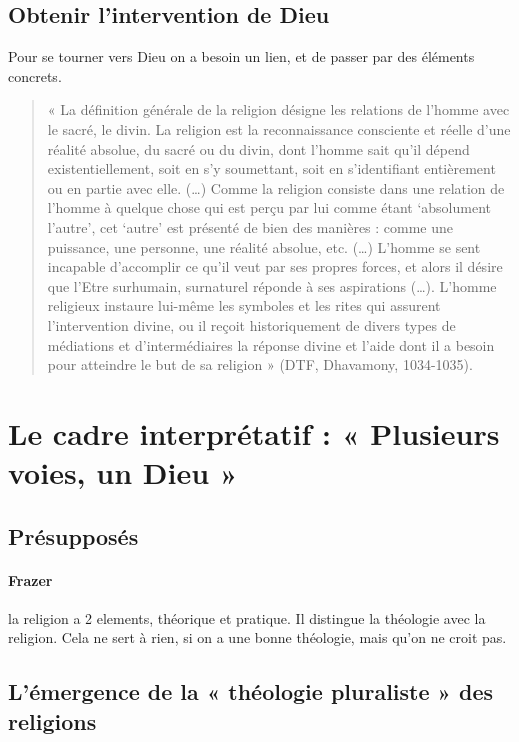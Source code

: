 \subsection{Obtenir l’intervention de Dieu }
	Pour se tourner vers Dieu on a besoin un lien, et de passer par des éléments concrets. 
	
\begin{quote}
    « La définition générale de la religion désigne les relations de l’homme avec le sacré, le divin. La religion est la reconnaissance consciente et réelle d’une réalité absolue, du sacré ou du divin, dont l’homme sait qu’il dépend existentiellement, soit en s’y soumettant, soit en s’identifiant entièrement ou en partie avec elle. (…) Comme la religion consiste dans une relation de l’homme à quelque chose qui est perçu par lui comme étant ‘absolument l’autre’, cet ‘autre’ est présenté de bien des manières : comme une puissance, une personne, une réalité absolue, etc. (…) L’homme se sent incapable d’accomplir ce qu’il veut par ses propres forces, et alors il désire que l’Etre surhumain, surnaturel réponde à ses aspirations (…). L’homme religieux instaure lui-même les symboles et les rites qui assurent l’intervention divine, ou il reçoit historiquement de divers types de médiations et d’intermédiaires la réponse divine et l’aide dont il a besoin pour atteindre le but de sa religion »  (DTF, Dhavamony, 1034-1035). 
\end{quote}





\section{Le cadre interprétatif : « Plusieurs voies, un Dieu »} 

\subsection{Présupposés} 

	\paragraph{Frazer}  la religion a 2 elements, théorique et pratique. 
	Il distingue la théologie avec la religion. Cela ne sert à rien, si on a une bonne théologie, mais qu'on ne croit pas.
\subsection{L’émergence de la « théologie pluraliste » des religions }


